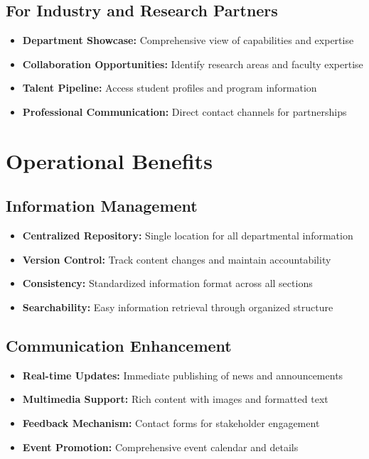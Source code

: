 \documentclass[12pt,a4paper]{report}
\begin{document}
\subsection{For Industry and Research Partners}
\begin{itemize}
    \item \textbf{Department Showcase:} Comprehensive view of capabilities and expertise
    \item \textbf{Collaboration Opportunities:} Identify research areas and faculty expertise
    \item \textbf{Talent Pipeline:} Access student profiles and program information
    \item \textbf{Professional Communication:} Direct contact channels for partnerships
\end{itemize}

\section{Operational Benefits}

\subsection{Information Management}
\begin{itemize}
    \item \textbf{Centralized Repository:} Single location for all departmental information
    \item \textbf{Version Control:} Track content changes and maintain accountability
    \item \textbf{Consistency:} Standardized information format across all sections
    \item \textbf{Searchability:} Easy information retrieval through organized structure
\end{itemize}

\subsection{Communication Enhancement}
\begin{itemize}
    \item \textbf{Real-time Updates:} Immediate publishing of news and announcements
    \item \textbf{Multimedia Support:} Rich content with images and formatted text
    \item \textbf{Feedback Mechanism:} Contact forms for stakeholder engagement
    \item \textbf{Event Promotion:} Comprehensive event calendar and details
\end{itemize}
\end{document}
